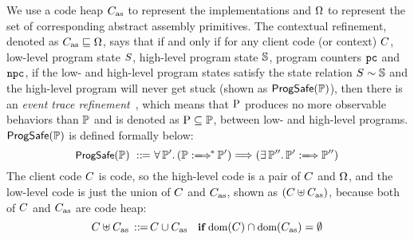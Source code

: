We use a code heap $C_{\text{as}}$
to represent the implementations
 and $\Omega$ to represent the set of corresponding
abstract assembly primitives.
The contextual refinement,
denoted as $C_{\text{as}} \sqsubseteq \Omega$,
says that if and only if for any client code
(or context) $C$, low-level program
state $S$, high-level program state $\mathbb{S}$, program counters
$\texttt{pc}$ and $\texttt{npc}$, if the low- and high-level program states satisfy the
state relation ${S} \sim {\mathbb{S}}$ and the high-level program
will never get stuck (shown as $\textsf{ProgSafe}(\mathbb{P})$),
then there is an {\it event trace refinement}~\cite{liang14lics},
which means that $\text{P}$ produces no more observable behaviors
than $\mathbb{P}$ and is denoted as $\text{P} \subseteq \mathbb{P}$,
between low- and high-level programs. $\textsf{ProgSafe}(\mathbb{P})$
is defined formally below:
\[
    \small
    \progsafe(\HProg) \ \define \
    \forall \, \HProg'. \,
    (\HGlobMultiTrans{\HProg}{}{*}{\HProg'})
    \Longrightarrow
    (\exists \, \HProg''. \,
        \HGlobTrans{\HProg'}{}{\HProg''})
\]
{\color{blue}
The client code $C$ is \sparc{} code, so
the high-level code is a pair of $C$ and $\Omega$,
and the low-level code is just the union of
$C$ and $C_{\text{as}}$, shown as
$(C\uplus C_{\text{as}})$, because both of
$C$ and $C_{\text{as}}$ are \sparc{} code heap:
\[
    \small
    C \uplus C_{\text{as}} \,::\!\!{=}\,
    C \cup C_{\text{as}} \quad
    \textbf{if} \ \text{dom}(C)\cap\text{dom}(C_{\text{as}}) = \emptyset
\]
}

